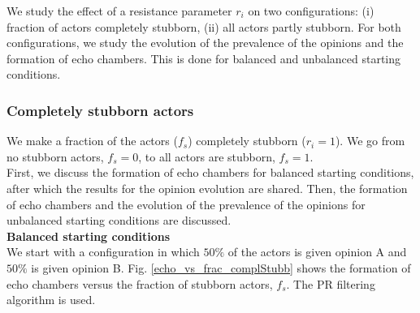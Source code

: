 \documentclass[11 pt , letterpaper , twoside , openright]{book}
\begin{document}
We study the effect of a resistance parameter $r_i$ on two configurations: (i) fraction of actors completely stubborn, (ii) all actors partly stubborn. For both configurations, we study the evolution of the prevalence of the opinions and the formation of echo chambers. This is done for balanced and unbalanced starting conditions.

\subsubsection{Completely stubborn actors}\label{complStubbAct}

We make a fraction of the actors ($f_s$) completely stubborn ($r_i = 1$). We go from no stubborn actors, $f_s=0$, to all actors are stubborn, $f_s=1$. \\
\newline
First, we discuss the formation of echo chambers for balanced starting conditions, after which the results for the opinion evolution are shared. Then, the formation of echo chambers and the evolution of the prevalence of the opinions for unbalanced starting conditions are discussed.\\
\newline
\textbf{Balanced starting conditions}\\
\newline
We start with a configuration in which $50 \%$ of the actors is given opinion A and $50 \%$ is given opinion B. Fig. \ref{echo_vs_frac_complStubb} shows the formation of echo chambers versus the fraction of stubborn actors, $f_s$. The PR filtering algorithm is used.
\end{document}
